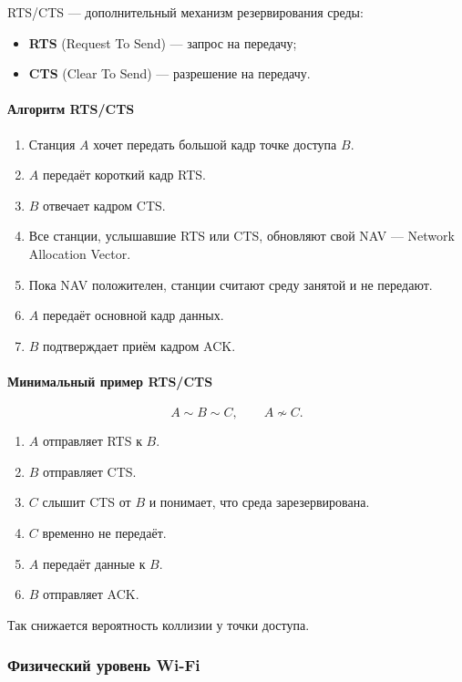 \documentclass[12pt,a4paper]{article}
\begin{document}
RTS/CTS --- дополнительный механизм резервирования среды:
\begin{itemize}
    \item \textbf{RTS} (Request To Send) --- запрос на передачу;
    \item \textbf{CTS} (Clear To Send) --- разрешение на передачу.
\end{itemize}

\paragraph{Алгоритм RTS/CTS}

\begin{enumerate}
    \item Станция $A$ хочет передать большой кадр точке доступа $B$.
    \item $A$ передаёт короткий кадр RTS.
    \item $B$ отвечает кадром CTS.
    \item Все станции, услышавшие RTS или CTS, обновляют свой NAV --- Network Allocation Vector.
    \item Пока NAV положителен, станции считают среду занятой и не передают.
    \item $A$ передаёт основной кадр данных.
    \item $B$ подтверждает приём кадром ACK.
\end{enumerate}

\paragraph{Минимальный пример RTS/CTS}

\[
A \sim B \sim C, \qquad A \not\sim C.
\]

\begin{enumerate}
    \item $A$ отправляет RTS к $B$.
    \item $B$ отправляет CTS.
    \item $C$ слышит CTS от $B$ и понимает, что среда зарезервирована.
    \item $C$ временно не передаёт.
    \item $A$ передаёт данные к $B$.
    \item $B$ отправляет ACK.
\end{enumerate}

Так снижается вероятность коллизии у точки доступа.

\subsubsection{Физический уровень Wi-Fi}
\end{document}
